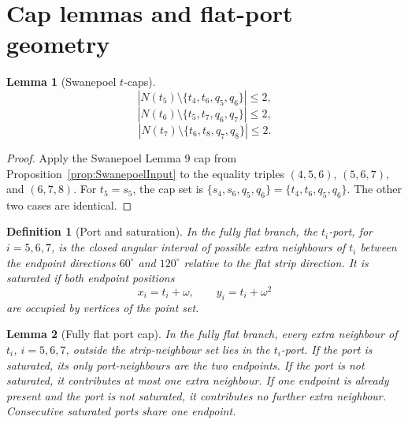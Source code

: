 \documentclass[11pt]{article}
\theoremstyle{plain}
\newtheorem{lemma}{Lemma}
\newtheorem{definition}{Definition}
\numberwithin{equation}{section}
\begin{document}
\section{Cap lemmas and flat-port geometry}

\begin{lemma}[Swanepoel $t$-caps]\label{lem:t-caps}
\[
 |N(t_5)\setminus\{t_4,t_6,q_5,q_6\}|\le2,
\]
\[
 |N(t_6)\setminus\{t_5,t_7,q_6,q_7\}|\le2,
\]
\[
 |N(t_7)\setminus\{t_6,t_8,q_7,q_8\}|\le2.
\]
\end{lemma}

\begin{proof}
Apply the Swanepoel Lemma 9 cap from Proposition~\ref{prop:SwanepoelInput} to the equality triples $(4,5,6)$, $(5,6,7)$, and $(6,7,8)$. For $t_5=s_5$, the cap set is $\{s_4,s_6,q_5,q_6\}=\{t_4,t_6,q_5,q_6\}$. The other two cases are identical.
\end{proof}

\begin{definition}[Port and saturation]\label{def:port}
In the fully flat branch, the $t_i$-port, for $i=5,6,7$, is the closed angular interval of possible extra neighbours of $t_i$ between the endpoint directions $60^\circ$ and $120^\circ$ relative to the flat strip direction. It is saturated if both endpoint positions
\[
 x_i=t_i+\omega,
 \qquad
 y_i=t_i+\omega^2
\]
are occupied by vertices of the point set.
\end{definition}

\begin{lemma}[Fully flat port cap]\label{lem:port}
In the fully flat branch, every extra neighbour of $t_i$, $i=5,6,7$, outside the strip-neighbour set lies in the $t_i$-port. If the port is saturated, its only port-neighbours are the two endpoints. If the port is not saturated, it contributes at most one extra neighbour. If one endpoint is already present and the port is not saturated, it contributes no further extra neighbour. Consecutive saturated ports share one endpoint.
\end{lemma}
\end{document}
